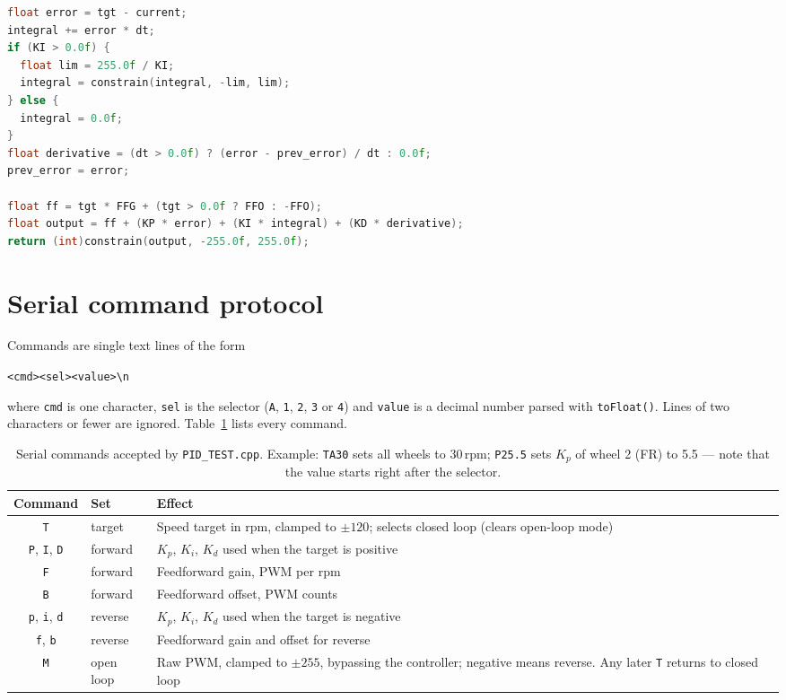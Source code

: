 \documentclass[11pt,a4paper]{report}
\newcommand{\code}[1]{\texttt{#1}}
\begin{document}
\begin{lstlisting}[language=C++,caption={Core of \texttt{SimplePID::compute()} (abridged).},label={lst:pid}]
float error = tgt - current;
integral += error * dt;
if (KI > 0.0f) {
  float lim = 255.0f / KI;
  integral = constrain(integral, -lim, lim);
} else {
  integral = 0.0f;
}
float derivative = (dt > 0.0f) ? (error - prev_error) / dt : 0.0f;
prev_error = error;

float ff = tgt * FFG + (tgt > 0.0f ? FFO : -FFO);
float output = ff + (KP * error) + (KI * integral) + (KD * derivative);
return (int)constrain(output, -255.0f, 255.0f);
\end{lstlisting}

\section{Serial command protocol}
Commands are single text lines of the form
\begin{center}
\code{<cmd><sel><value>\textbackslash n}
\end{center}
where \code{cmd} is one character, \code{sel} is the selector (\code{A}, \code{1}, \code{2}, \code{3} or \code{4}) and \code{value} is a decimal number parsed with \code{toFloat()}. Lines of two characters or fewer are ignored. Table~\ref{tab:cmds} lists every command.

\begin{table}[H]
\centering
\caption{Serial commands accepted by \code{PID\_TEST.cpp}. Example: \code{TA30} sets all wheels to 30\,rpm; \code{P25.5} sets $K_p$ of wheel 2 (FR) to 5.5 --- note that the value starts right after the selector.}\label{tab:cmds}
\begin{tabular}{@{}clp{7.2cm}@{}}
\toprule
Command & Set & Effect\\
\midrule
\code{T} & target & Speed target in rpm, clamped to $\pm120$; selects closed loop (clears open-loop mode)\\
\code{P}, \code{I}, \code{D} & forward & $K_p$, $K_i$, $K_d$ used when the target is positive\\
\code{F} & forward & Feedforward gain, PWM per rpm\\
\code{B} & forward & Feedforward offset, PWM counts\\
\code{p}, \code{i}, \code{d} & reverse & $K_p$, $K_i$, $K_d$ used when the target is negative\\
\code{f}, \code{b} & reverse & Feedforward gain and offset for reverse\\
\code{M} & open loop & Raw PWM, clamped to $\pm255$, bypassing the controller; negative means reverse. Any later \code{T} returns to closed loop\\
\bottomrule
\end{tabular}
\end{table}
\end{document}
